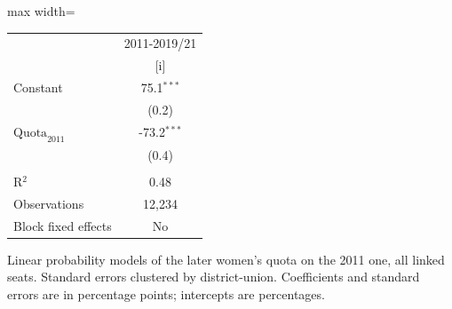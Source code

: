 
\begingroup
\centering
\scriptsize
\begin{adjustbox}{max width=\linewidth}
   \begin{threeparttable}[b]
      \begin{tabular}{lc}
         \toprule
                                & 2011-2019/21 \\
                                & [i]\\
         \midrule
         Constant               & 75.1$^{***}$\\
                                & (0.2)\\
         $\text{Quota}_{2011}$  & -73.2$^{***}$\\
                                & (0.4)\\
          \\
         R$^2$                  & 0.48\\
         Observations           & 12,234\\
         Block fixed effects    & No\\
         \bottomrule
      \end{tabular}

      \begin{tablenotes}
         \item Linear probability models of the later women's quota on the 2011 one, all linked seats. Standard errors clustered by district-union. Coefficients and standard errors are in percentage points; intercepts are percentages.
      \end{tablenotes}
   \end{threeparttable}
\end{adjustbox}
\par\endgroup


